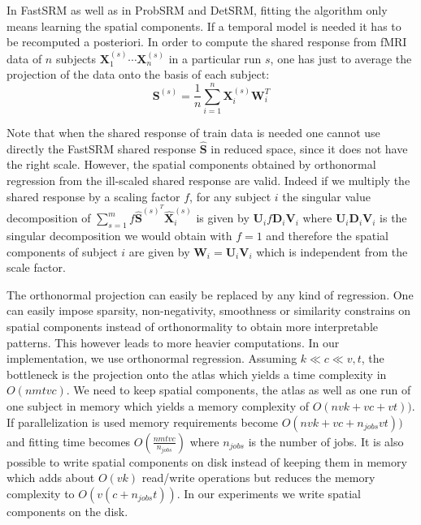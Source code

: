 \documentclass{report}
\begin{document}
In FastSRM as well as in ProbSRM and DetSRM, fitting the algorithm only means learning the spatial components. If a temporal model is needed it has to be recomputed a posteriori.
%
In order to compute the shared response from fMRI data of $n$ subjects $\mathbf{X}^{(s)}_1 \cdots \mathbf{X}^{(s)}_n$ in a particular run $s$, one has just to average the projection of the data onto the basis of each subject:
\[
	\mathbf{S}^{(s)} = \frac{1}{n}\sum_{i=1}^n \mathbf{X}^{(s)}_i \mathbf{W}_i^T
\]

Note that when the shared response of train data is needed one cannot use directly the FastSRM shared response  $\hat{\mathbf{S}}$ in reduced space, since it does not have the right scale.
%
However, the spatial components obtained by orthonormal regression from the ill-scaled shared response are valid. 
%
Indeed if we multiply the shared response by a scaling factor $f$, for any subject $i$ the singular value decomposition of $\sum_{s=1}^m f \mathbf{\hat{S}}^{(s)^T} \hat{\mathbf{X}}^{(s)}_i$ is given by $\mathbf{U}_i f \mathbf{D}_i \mathbf{V}_i$ where $\mathbf{U}_i \mathbf{D}_i \mathbf{V}_i$ is the singular decomposition we would obtain with $f=1$ and therefore the spatial components of subject $i$ are given by $\mathbf{W}_i = \mathbf{U}_i \mathbf{V}_i$ which is independent from the scale factor.

The orthonormal projection can easily be replaced by any kind of regression. One can easily impose sparsity, non-negativity, smoothness or similarity constrains on spatial components instead of orthonormality to obtain more interpretable patterns.
%
This however leads to more heavier computations.
%
In our implementation, we use orthonormal regression.
%
Assuming $k \ll c \ll v, t$, the bottleneck is the projection onto the atlas which yields a time complexity in $O(n m t v c)$.
%
We need to keep spatial components, the atlas as well as one run of one subject in memory which yields a memory complexity of $O(nvk + vc + vt))$.
%
If parallelization is used memory requirements become $O(nvk + vc + n_{jobs} vt))$ and fitting time becomes $O(\frac{nmtvc}{n_{jobs}})$ where $n_{jobs}$ is the number of jobs. 
%
It is also possible to write spatial components on disk instead of keeping them in memory which adds about $O(vk)$ read/write operations but reduces the memory complexity to $O(v(c + n_{jobs}t))$. In our experiments we write spatial components on the disk.
\end{document}
